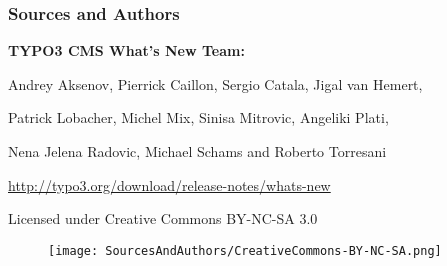 \begin{frame}[fragile]
	\frametitle{Sources and Authors}

	\vspace{-0.6cm}

	\centerline{\textbf{TYPO3 CMS What's New Team:}}

	\begin{center}
		\centerline{Andrey Aksenov, Pierrick Caillon, Sergio Catala, Jigal van Hemert,}
		\centerline{Patrick Lobacher, Michel Mix, Sinisa Mitrovic, Angeliki Plati,}
		\centerline{Nena Jelena Radovic, Michael Schams and Roberto Torresani}
	\end{center}

	\vspace{0.4cm}

	\smaller\begin{center}\url{http://typo3.org/download/release-notes/whats-new}\end{center}\normalsize

	\vspace{0.8cm}

	\smaller\begin{center}Licensed under Creative Commons BY-NC-SA 3.0\end{center}\normalsize
	\begin{figure}\vspace*{-0.4cm}
		\texttt{[image: SourcesAndAuthors/CreativeCommons-BY-NC-SA.png]}
	\end{figure}

\end{frame}

